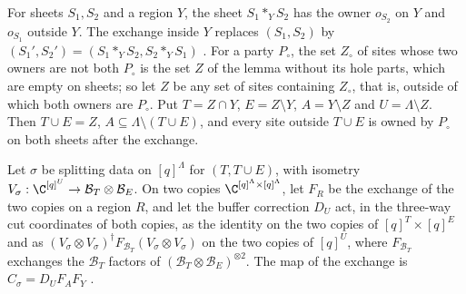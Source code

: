 \begin{definition}
    \label{def:party_exchange_sets}
    \leanok
    For sheets $S_1,S_2$ and a region $Y$, the sheet $S_1\ast_YS_2$ has the owner $o_{S_2}$ on
    $Y$ and $o_{S_1}$ outside $Y$. The exchange inside $Y$ replaces $(S_1,S_2)$ by
    $(S_1',S_2')=(S_1\ast_YS_2,S_2\ast_YS_1)$ \cite[Lemma~6.6]{OpenAI2026PolynomialPEPS}. For a
    party $P_\circ$, the set $Z_\circ$ of sites whose two owners are not both $P_\circ$ is the set
    $Z$ of the lemma without its hole parts, which are empty on sheets; so let $Z$ be any set of
    sites containing $Z_\circ$, that is, outside of which both owners are $P_\circ$. Put
    $T=Z\cap Y$, $E=Z\setminus Y$, $A=Y\setminus Z$ and $U=\Lambda\setminus Z$. Then
    $T\cup E=Z$, $A\subseteq\Lambda\setminus(T\cup E)$, and every site outside $T\cup E$ is owned
    by $P_\circ$ on both sheets after the exchange.
\end{definition}

\begin{definition}
    \label{def:party_exchange_map}
    \leanok
    Let $\sigma$ be splitting data on $[q]^\Lambda$ for $(T,T\cup E)$, with isometry
    $V_\sigma:\C^{[q]^U}\to\mathcal B_T\otimes\mathcal B_E$. On two copies
    $\C^{[q]^\Lambda\times[q]^\Lambda}$, let $F_R$ be the exchange of the two copies on a region
    $R$, and let the buffer correction $D_U$ act, in the three-way cut coordinates of both
    copies, as the identity on the two copies of $[q]^T\times[q]^E$ and as
    $(V_\sigma\otimes V_\sigma)^\dagger F_{\mathcal B_T}(V_\sigma\otimes V_\sigma)$ on the two
    copies of $[q]^U$, where $F_{\mathcal B_T}$ exchanges the $\mathcal B_T$ factors of
    $(\mathcal B_T\otimes\mathcal B_E)^{\otimes2}$. The map of the exchange is
    $C_\sigma=D_UF_AF_Y$ \cite[proof of Lemma~6.6]{OpenAI2026PolynomialPEPS}.
\end{definition}


